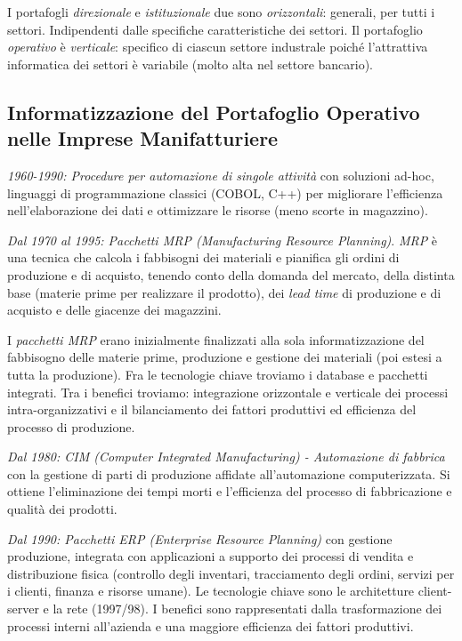 \documentclass[a4paper, notitlepage, 9pt]{extreport}
\begin{document}
\noindent
I portafogli \textit{direzionale} e \textit{istituzionale} due sono \textit{orizzontali}: generali, per tutti i settori. Indipendenti dalle specifiche caratteristiche dei settori. Il portafoglio \textit{operativo} è \textit{verticale}: specifico di ciascun settore industrale poiché l'attrattiva informatica dei settori è variabile (molto alta nel settore bancario).

\subsection*{Informatizzazione del Portafoglio Operativo nelle Imprese Manifatturiere}
\textit{1960-1990: Procedure per automazione di singole attività} con soluzioni ad-hoc, linguaggi di programmazione classici (COBOL, C++) per migliorare l'efficienza nell'elaborazione dei dati e ottimizzare le risorse (meno scorte in magazzino).

\noindent
\textit{Dal 1970 al 1995: Pacchetti MRP (Manufacturing Resource Planning)}. \textit{MRP} è una tecnica che calcola i fabbisogni dei materiali e pianifica gli ordini di produzione e di acquisto, tenendo conto della domanda del mercato, della distinta base (materie prime per realizzare il prodotto), dei \textit{lead time} di produzione e di acquisto e delle giacenze dei magazzini.

I \textit{pacchetti MRP} erano inizialmente finalizzati alla sola informatizzazione del fabbisogno delle materie prime, produzione e gestione dei materiali (poi estesi a tutta la produzione). Fra le tecnologie chiave troviamo i database e pacchetti integrati. Tra i benefici troviamo: integrazione orizzontale e verticale dei processi intra-organizzativi e il bilanciamento dei fattori produttivi ed efficienza del processo di produzione.
\newline

\noindent
\textit{Dal 1980: CIM (Computer Integrated Manufacturing) - Automazione di fabbrica} con la gestione di parti di produzione affidate all’automazione computerizzata. Si ottiene l'eliminazione dei tempi morti e l'efficienza del processo di fabbricazione e qualità dei prodotti.
\newline

\noindent
\textit{Dal 1990: Pacchetti ERP (Enterprise Resource Planning)} con gestione produzione, integrata con applicazioni a supporto dei processi di vendita e distribuzione fisica (controllo degli inventari, tracciamento degli ordini, servizi per i clienti, finanza e risorse umane). Le tecnologie chiave sono le architetture client-server e la rete (1997/98). I benefici sono rappresentati dalla trasformazione dei processi interni all’azienda e una maggiore efficienza dei fattori produttivi.
\newline
\end{document}
